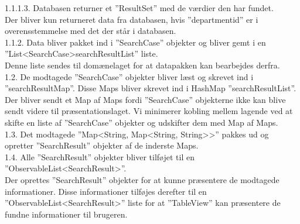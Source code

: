 1.1.1.3.	Databasen returner et ”ResultSet” med de værdier den har fundet. \\
Der bliver kun returneret data fra databasen, hvis ”departmentid” er i overensstemmelse med det der står i databasen. \\
1.1.2.	Data bliver pakket ind i  ”SearchCase” objekter og bliver gemt i en ”List\textless SearchCase\textgreater searchResultList” liste.\\
Denne liste sendes til domænelaget for at datapakken kan bearbejdes derfra. \\
1.2.	De modtagede ”SearchCase” objekter bliver læst og skrevet ind i ”searchResultMap”. Disse Maps bliver skrevet ind i HashMap ”searchResultList”.\\
Der bliver sendt et Map af Maps fordi ”SearchCase” objekterne ikke kan blive sendt videre til præsentationslaget. Vi minimerer kobling mellem lagende ved at skifte en liste af ”SearchCase” objekter  og udskifter dem med Map af Maps.\\
1.3.	Det modtagede ”Map\textless String, Map\textless String, String\textgreater \textgreater ” pakkes ud og opretter ”SearchResult” objekter af de inderste Maps. \\
1.4.	Alle ”SearchResult” objekter bliver tilføjet til en ”ObservableList\textless SearchResult\textgreater ”. \\
Der oprettes ”SearchResult” objekter for at kunne præsentere de modtagede informationer. Disse informationer tilføjes derefter til en ”ObservableList\textless SearchResult\textgreater ” liste for at ”TableView” kan præsentere de fundne informationer til brugeren. \\